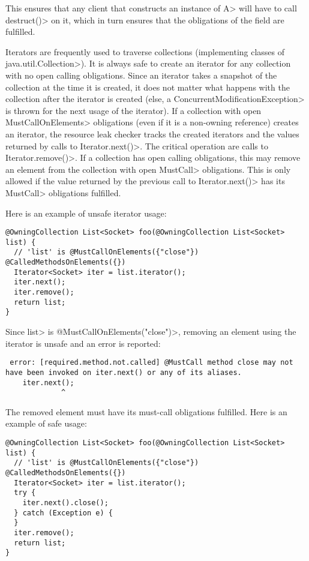 This ensures that any client that constructs an instance of \<A> will have to call \<destruct()> on it, which in turn ensures that the obligations of the field are fulfilled.

Iterators are frequently used to traverse collections (implementing classes of \<java.util.Collection>). It is always safe to create an iterator for any collection with no open calling obligations. Since an iterator takes a snapshot of the collection at the time it is created, it does not matter what happens with the collection after the iterator is created (else, a \<ConcurrentModificationException> is thrown for the next usage of the iterator).
If a collection with open \<MustCallOnElements> obligations (even if it is a non-owning reference) creates an iterator, the resource leak checker tracks the created iterators and the values returned by calls to \<Iterator.next()>. The critical operation are calls to \<Iterator.remove()>. If a collection has open calling obligations, this may remove an element from the collection with open \<MustCall> obligations. This is only allowed if the value returned by the previous call to \<Iterator.next()> has its \<MustCall> obligations fulfilled.

Here is an example of unsafe iterator usage:

\begin{verbatim}
@OwningCollection List<Socket> foo(@OwningCollection List<Socket> list) {
  // 'list' is @MustCallOnElements({"close"}) @CalledMethodsOnElements({})
  Iterator<Socket> iter = list.iterator();
  iter.next();
  iter.remove();
  return list;
}
\end{verbatim}

Since \<list> is \<@MustCallOnElements("close")>, removing an element using the iterator is unsafe and an error is reported:
\begin{verbatim}
 error: [required.method.not.called] @MustCall method close may not have been invoked on iter.next() or any of its aliases.
    iter.next();
             ^
\end{verbatim}

The removed element must have its must-call obligations fulfilled. Here is an example of safe usage:

\begin{verbatim}
@OwningCollection List<Socket> foo(@OwningCollection List<Socket> list) {
  // 'list' is @MustCallOnElements({"close"}) @CalledMethodsOnElements({})
  Iterator<Socket> iter = list.iterator();
  try {
    iter.next().close();
  } catch (Exception e) {
  }
  iter.remove();
  return list;
}
\end{verbatim}

